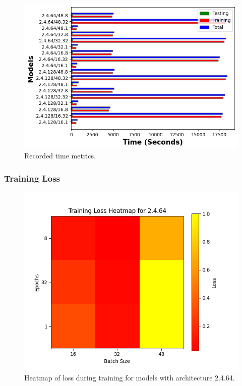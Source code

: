 \documentclass[12pt]{article}
\begin{document}
\begin{figure}[H]
\includegraphics[width=\textwidth]{timings}
\centering
\caption{Recorded time metrics.}
\label{fig:time-metrics}
\end{figure}


\subsubsection{Training Loss}

\begin{figure}[H]
\includegraphics[width=\textwidth]{heatmap_training_loss_2.4.64}
\centering
\caption{Heatmap of loss during training for models with architecture 2.4.64.}
\label{fig:time-metrics}
\end{figure}
\end{document}
